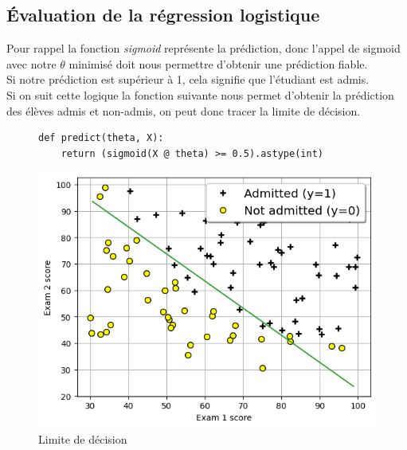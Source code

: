 \subsection{Évaluation de la régression logistique}

Pour rappel la fonction \textit{sigmoid} représente la prédiction, donc l'appel de sigmoid avec notre $\theta$ minimisé doit nous permettre d'obtenir une prédiction fiable.  \\
Si notre prédiction est supérieur à 1, cela signifie que l'étudiant est admis. \\
Si on suit cette logique la fonction suivante nous permet d'obtenir la prédiction des élèves admis et non-admis, on peut donc tracer la limite de décision.


\begin{figure}[!h]
    \begin{minipage}{.40\linewidth}
\begin{verbatim}
def predict(theta, X):
    return (sigmoid(X @ theta) >= 0.5).astype(int)
\end{verbatim}   
    \end{minipage}\hfill
    \begin{minipage}{.56\linewidth}
        \begin{center}
            \includegraphics[width=1\textwidth]{./img/3.2.png}
            \caption{\label{fig:3.2}Limite de décision}  
        \end{center}
    \end{minipage}
\end{figure}

